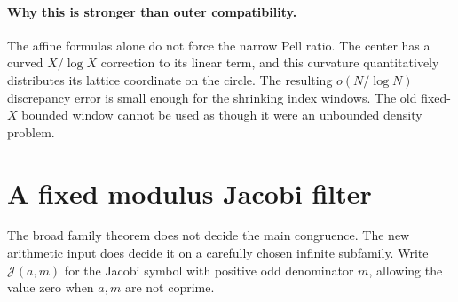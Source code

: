 \documentclass[11pt,letterpaper]{article}
\theoremstyle{definition}\newtheorem{definition}[theorem]{Definition}
\theoremstyle{remark}\newtheorem{remark}[theorem]{Remark}
\begin{document}
\paragraph{Why this is stronger than outer compatibility.}
The affine formulas alone do not force the narrow Pell ratio. The center has a curved $X/\log X$ correction to its linear term, and this curvature quantitatively distributes its lattice coordinate on the circle. The resulting $o(N/\log N)$ discrepancy error is small enough for the shrinking index windows. The old fixed-$X$ bounded window cannot be used as though it were an unbounded density problem.


\section{A fixed modulus Jacobi filter}\label{fup:nr:sec:jacobi}
The broad family theorem does not decide the main congruence. The new arithmetic input does decide it on a carefully chosen infinite subfamily. Write $\mathcal J(a,m)$ for the Jacobi symbol with positive odd denominator $m$, allowing the value zero when $a,m$ are not coprime.
\end{document}
